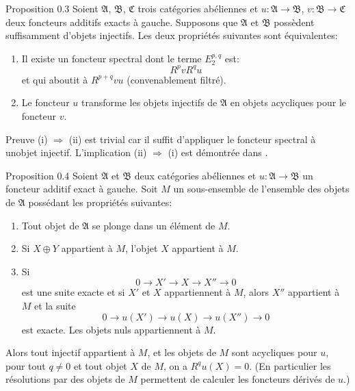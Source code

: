\begin{enonce*}{Proposition 0.3}
Soient $\mathfrak{A}$, $\mathfrak{B}$, $\mathfrak{C}$ trois
catégories abéliennes et $u : \mathfrak{A} \rightarrow
\mathfrak{B}$, $v : \mathfrak{B} \rightarrow \mathfrak{C}$ deux
foncteurs additifs exacts à gauche. Supposons que $\mathfrak{A}$ et
$\mathfrak{B}$ possèdent suffisamment d'objets injectifs. Les deux
propriétés suivantes sont équivalentes:
\begin{enumerate}
\renewcommand{\theenumi}{\roman{enumi}}
\renewcommand{\labelenumi}{\theenumi)}
\item Il existe un foncteur spectral dont le terme $E^{p, q}_2$ est:
$$
R^p vR^qu
$$
et qui aboutit à $R^{p+q} vu$ (convenablement filtré).
\item Le foncteur $u$ transforme les objets injectifs de
  $\mathfrak{A}$ en objets acycliques pour le foncteur $v$.
\end{enumerate}
\end{enonce*}

\begin{enonce*}[remark]{Preuve}
(i) $\Rightarrow$ (ii) est trivial car il suffit d'appliquer le foncteur
  spectral à un\pageoriginale objet injectif. L'implication (ii) $\Rightarrow$ (i)
  est démontrée dans \cite{11}.
\end{enonce*}

\begin{enonce*}{Proposition 0.4}
Soient $\mathfrak{A}$ et $\mathfrak{B}$ deux catégories abéliennes
et $u : \mathfrak{A} \rightarrow \mathfrak{B}$ un foncteur %
additif exact à gauche. Soit $M$ un sous-ensemble de l'ensemble des objets
de $\mathfrak{A}$ possédant les propriétés suivantes:
\begin{enumerate}
\renewcommand{\labelenumi}{\theenumi)}
\item Tout objet de $\mathfrak{A}$ se plonge dans un élément de
  $M$.

\item Si $X \oplus Y$ appartient à $M$, l'objet $X$ appartient à
  $M$.

\item Si
$$
0 \longrightarrow X' \longrightarrow X \longrightarrow X''
\longrightarrow 0
$$
est une suite exacte et si $X'$ et $X$ appartiennent à $M$, alors
$X''$ appartient à $M$ et la suite
$$
0 \longrightarrow u(X') \longrightarrow u(X) \longrightarrow u(X'')
\longrightarrow 0
$$
est exacte. Les objets nuls appartiennent à $M$.
\end{enumerate}

Alors tout injectif appartient à $M$, et les objets de $M$ sont
acycliques pour $u$, \ie pour tout $q \neq 0$ et tout objet $X$ de
$M$, on a $R^q u(X) = 0$. (En particulier les résolutions par des
objets de $M$ permettent de calculer les foncteurs dérivés de $u$.)
\end{enonce*}

